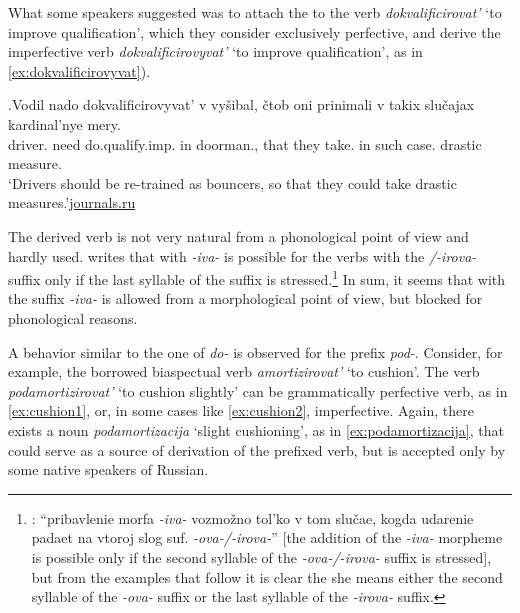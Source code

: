 What some speakers suggested was to attach the  to the verb \textit{dokvalificirovat'} `to improve qualification', which they consider exclusively perfective, and derive the imperfective verb \textit{dokvalificirovyvat'} `to improve qualification', as in \ref{ex:dokvalificirovyvat}). 

\exg.\label{ex:dokvalificirovyvat}Vodil nado dokvalificirovyvat' v vy\v{s}ibal, \v{c}tob oni prinimali v takix slu\v{c}ajax kardinal'nye mery.\\
driver. need do.qualify.imp. in doorman., that they take. in such case. drastic measure.\\
\trans `Drivers should be re-trained as bouncers, so that they could take drastic measures.'\hbox{}\hfill\hbox{\url{journals.ru}}

The derived verb is not very natural from a phonological point of view and hardly used. \citet[590]{Shvedova:82} writes that  with \textit{-iva-} is possible for the verbs with the \textit{/-irova-} suffix only if the last syllable of the suffix is stressed.\footnote{\citet[590]{Shvedova:82}: ``pribavlenie morfa \textit{-­iva-} vozmo\v{z}no tol'ko v tom slu\v{c}ae, kogda udarenie padaet na vtoroj slog suf. \textit{-­ova-/-irova-}'' [the addition of the \textit{-iva-} morpheme is possible only if the second syllable of the \textit{-­ova-/-irova-} suffix is stressed], but from the examples that follow it is clear the she means either the second syllable of the \textit{-ova-} suffix or the last syllable of the \textit{-irova-} suffix.} In sum, it seems that  with the suffix \textit{-iva-} is allowed from a morphological point of view, but blocked for phonological reasons.
 
A behavior similar to the one of \textit{do-} is observed for the prefix \textit{pod-}. Consider, for example, the borrowed biaspectual verb \textit{amortizirovat'} `to cushion'. The verb \textit{podamortizirovat'} `to cushion slightly' can be grammatically perfective verb, as in \ref{ex:cushion1}, or, in some cases like \ref{ex:cushion2}, imperfective. Again, there exists a noun \textit{podamortizacija} `slight cushioning', as in \ref{ex:podamortizacija}, that could serve as a source of derivation of the prefixed verb, but is accepted only by some native speakers of Russian.

